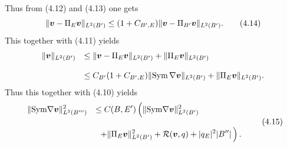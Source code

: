 Thus from (4.12) and (4.13) one gets
$$\displaystyle
\Vert\mbox{\boldmath $v$}-\Pi_{E}\mbox{\boldmath $v$}\Vert_{L^2(B')}
\le (1+C_{B',E})\Vert\mbox{\boldmath $v$}-\Pi_{B'}\mbox{\boldmath $v$}\Vert_{L^2(B')}.
\tag {4.14}
$$
This together with (4.11) yields
$$\begin{array}{ll}
\displaystyle
\Vert \mbox{\boldmath $v$}\Vert_{L^2(B')}
&
\displaystyle
\le\Vert \mbox{\boldmath $v$}-\Pi_{E}\mbox{\boldmath $v$}\Vert_{L^2(B')}+
\Vert\Pi_E\mbox{\boldmath $v$}\Vert_{L^2(B')}
\\
\\
\displaystyle
&
\displaystyle
\le C_{B'}(1+C_{B', E})\Vert\text{Sym}\,\nabla\mbox{\boldmath $v$}\Vert_{L^2(B')}
+\Vert\Pi_E\mbox{\boldmath $v$}\Vert_{L^2(B')}.
\end{array}
$$
Thus this together with (4.10) yields
$$\begin{array}{ll}
\displaystyle
\Vert\text{Sym}\nabla\mbox{\boldmath $v$}\Vert_{L^2(B''')}^2
&
\displaystyle
\le
C(B,E')
\left(\Vert\text{Sym}\nabla\mbox{\boldmath $v$}\Vert_{L^2(B')}^2
\right.
\\
\\
\displaystyle
&
\displaystyle
\,\,\,
\left.
+\Vert\Pi_{E}\mbox{\boldmath $v$}\Vert_{L^2(B')}^2
+{\cal R}(\mbox{\boldmath $v$},q)+\vert q_E\vert^2\vert B''\vert
\,\right).
\end{array}
\tag {4.15}
$$


